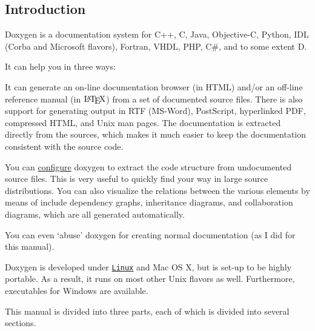 \begin{center}  \end{center} 

\subsection*{Introduction}

Doxygen is a documentation system for C++, C, Java, Objective-\/C, Python, IDL (Corba and Microsoft flavors), Fortran, VHDL, PHP, C\#, and to some extent D.

It can help you in three ways: 
\begin{DoxyEnumerate}
\item It can generate an on-\/line documentation browser (in HTML) and/or an off-\/line reference manual (in $\mbox{\LaTeX}$) from a set of documented source files. There is also support for generating output in RTF (MS-\/Word), PostScript, hyperlinked PDF, compressed HTML, and Unix man pages. The documentation is extracted directly from the sources, which makes it much easier to keep the documentation consistent with the source code. 
\item You can \hyperlink{starting_extract_all}{configure} doxygen to extract the code structure from undocumented source files. This is very useful to quickly find your way in large source distributions. You can also visualize the relations between the various elements by means of include dependency graphs, inheritance diagrams, and collaboration diagrams, which are all generated automatically. 
\item You can even `abuse' doxygen for creating normal documentation (as I did for this manual). 
\end{DoxyEnumerate}

Doxygen is developed under \href{http://www.linux.org}{\tt Linux} and Mac OS X, but is set-\/up to be highly portable. As a result, it runs on most other Unix flavors as well. Furthermore, executables for Windows are available.

\par
 This manual is divided into three parts, each of which is divided into several sections.

